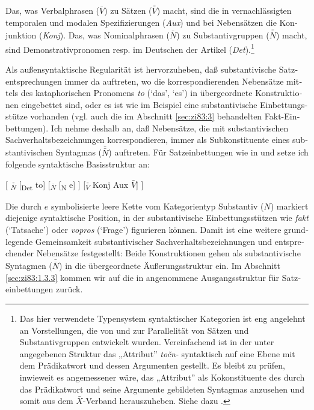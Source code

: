 \documentclass[output=paper]{langscibook}
\begin{document}
\begin{otherlanguage}{german}
Das, was Verbalphrasen ($\bar{V}$) zu Sätzen ($\bar{\bar{V}}$) macht, sind die in  vernachlässigten temporalen und modalen Spezifizierungen (\textit{Aux}) und bei Nebensätzen die Konjunktion (\textit{Konj}).
Das, was Nominalphrasen (${\bar{N}}$) zu Substantivgruppen ($\bar{\bar{N}}$) macht, sind Demonstrativpronomen resp. im Deutschen der Artikel (\textit{Det}).\footnote{Das hier verwendete Typensystem syntaktischer Kategorien ist eng angelehnt an Vorstellungen, die von \citet{chomsky1970remarks-on-nominalization-} und \citet{jackendoff1974introduction-to-the-xbar-convention., jackendoff1977xbar-syntax:-a-study-of-phrase-structure} zur Parallelität von Sätzen und Substantivgruppen entwickelt wurden. Vereinfachend ist in der unter  angegebenen Struktur das „Attribut” \textit{točn-} syntaktisch auf eine Ebene mit dem Prädikatwort und dessen Argumenten gestellt. Es bleibt zu prüfen, inwieweit es angemessener wäre, das „Attribut” als Kokonstituente des durch das Prädikatwort und seine Argumente gebildeten Syntagmas anzusehen und somit aus dem $\bar{X}$-Verband herauszuheben. Siehe dazu \citet{jackendoff1977xbar-syntax:-a-study-of-phrase-structure}.
}

Als außensyntaktische Regularität ist hervorzuheben, daß substantivische Satzentsprechungen immer da auftreten, wo die korrespondierenden Nebensätze mittels des kataphorischen Pronomens \textit{to} (‘das’, ‘es’) in übergeordnete Konstruktionen eingebettet sind, oder es ist wie im Beispiel  eine substantivische Einbettungsstütze vorhanden (vgl. auch die im Abschnitt \ref{sec:zi83:3} behandelten Fakt\hyp Einbettungen). Ich nehme deshalb an, daß Nebensätze, die mit substantivischen Sachverhaltsbezeichnungen korrespondieren, immer als Subkonstituente eines substantivischen Syntagmas ($\bar{\bar{N}}$) auftreten. Für Satzeinbettungen wie in  und  setze ich folgende syntaktische Basisstruktur an:

\ea{} \label{ex:zi83:5}
    [ \textsubscript{$\bar{\bar{N}}$}
        [\textsubscript{Det} to]
        [\textsubscript{$\bar{N}$}
            [\textsubscript{N} e]
        ]
        [\textsubscript{$\bar{\bar{V}}$} \thickspace{} Konj \thickspace{} Aux \thickspace{} $\bar{V}$]
    ]
\z

\noindent Die durch $e$ symbolisierte leere Kette vom Kategorientyp Substantiv ($N$) markiert diejenige syntaktische Position, in der substantivische Einbettungsstützen wie \textit{fakt} (‘Tatsache’) oder \textit{vopros} (‘Frage’) figurieren können. Damit ist eine wei\-tere grundlegende Gemeinsamkeit substantivischer Sachverhaltsbezeichnungen und entsprechender Nebensätze festgestellt: Beide Konstruktionen gehen als substantivische Syntagmen ($\bar{\bar{N}}$) in die übergeordnete Äußerungsstruktur ein. Im Abschnitt \ref{sec:zi83:1.3.3} kommen wir auf die in  angenommene Ausgangsstruktur für Satzeinbettungen zurück.


\end{otherlanguage}
\end{document}
